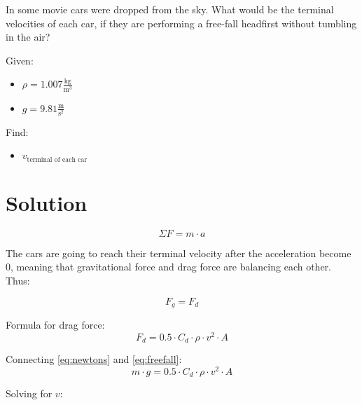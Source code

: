 
In some movie cars were dropped from the sky.
What would be the terminal velocities of each car, if they are
performing a free-fall headfirst without tumbling in the air?

\bigbreak Given:
\begin{itemize}
    \item $ \rho = 1.007 \frac{\text{kg}}{\text{m}^3} $
    \item $ g = 9.81 \frac{\text{m}}{\text{s}^2} $
\end{itemize}

Find:
\begin{itemize}
    \item $ v_{\text{terminal of each car}} $
\end{itemize}


\section*{Solution}

\begin{equation}
    \label{eq:newtons}
    \Sigma F = m \cdot a
\end{equation}

The cars are going to reach their terminal velocity after the acceleration become 0,
meaning that gravitational force and drag force are balancing each other. Thus:

$$ F_g = F_d $$

Formula for drag force:
\begin{equation}
    \label{eq:freefall}
    F_d = 0.5 \cdot C_d \cdot \rho \cdot v^2 \cdot A
\end{equation}

Connecting \ref{eq:newtons} and \ref{eq:freefall}:
$$m \cdot g = 0.5 \cdot C_d \cdot \rho \cdot v^2 \cdot A $$

Solving for $v$:

